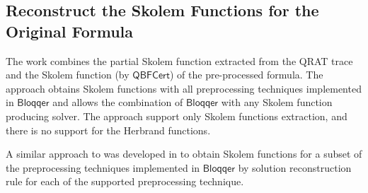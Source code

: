 \documentclass[runningheads]{llncs}
\newcommand{\bloqqer}{\mathsf{Bloqqer}}
\newcommand{\0}{0}
\newcommand{\1}{1}
\def\qcert{\mathsf{QBFCert}}
\begin{document}
\subsection{Reconstruct the Skolem Functions for the Original Formula} \label{subsec:skolem-compete}

The work \cite{FazekasHSB17} combines the partial Skolem function extracted from the QRAT trace and the Skolem function (by $\qcert$) of the pre-processed formula. The approach obtains Skolem functions with all preprocessing techniques implemented in  $\bloqqer$ and allows the combination of $\bloqqer$ with any Skolem function producing solver. The approach support only Skolem functions extraction, and there is no support for the Herbrand functions.

A similar approach to  \cite{FazekasHSB17} was developed in \cite{JanotaGM13} to obtain Skolem functions for a subset of the preprocessing techniques implemented in $\bloqqer$ by solution reconstruction rule for each of the supported preprocessing technique.
\end{document}
